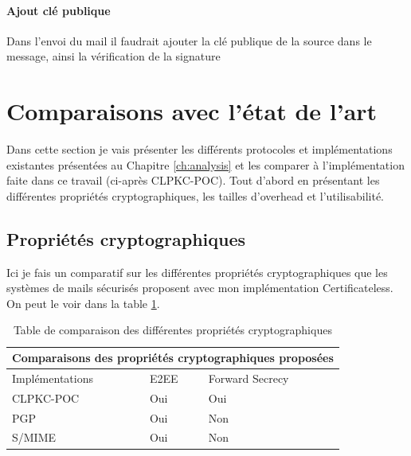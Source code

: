 \paragraph*{Ajout clé publique}
Dans l'envoi du mail il faudrait ajouter la clé publique de la source dans le message, ainsi la vérification de la signature

\section{Comparaisons avec l'état de l'art}
Dans cette section je vais présenter les différents protocoles et implémentations existantes présentées au Chapitre \ref{ch:analysis} et les comparer à l'implémentation faite dans ce travail (ci-après CLPKC-POC). Tout d'abord en présentant les différentes propriétés cryptographiques, les tailles d'overhead et l'utilisabilité.

\subsection{Propriétés cryptographiques}
Ici je fais un comparatif sur les différentes propriétés cryptographiques que les systèmes de mails sécurisés proposent avec mon implémentation Certificateless. On peut le voir dans la table \ref{table:comparisonProperties}.
\begin{table}[h!]
	\centering
	\begin{tabular}{ |p{3cm}||p{3cm}|p{3cm}| }
		\hline
		\multicolumn{3}{|c|}{Comparaisons des propriétés cryptographiques proposées} \\
		\hline
		Implémentations & E2EE & Forward Secrecy\\
		\hline
		CLPKC-POC   & Oui & Oui\\
		PGP & Oui & Non\\
		S/MIME & Oui & Non\\
		\hline
	\end{tabular}
	\caption{Table de comparaison des différentes propriétés cryptographiques }
	\label{table:comparisonProperties}
\end{table}

